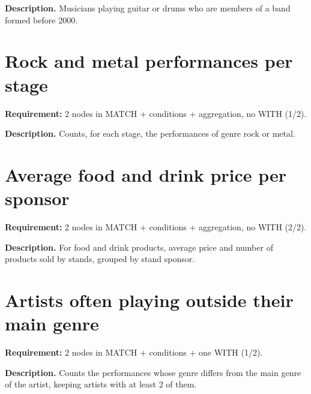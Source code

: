 \textbf{Description.} Musicians playing guitar or drums who are members of a band formed before 2000. 



\section{Rock and metal performances per stage}
\textbf{Requirement:} 2 nodes in MATCH + conditions + aggregation, no WITH (1/2).

\textbf{Description.} Counts, for each stage, the performances of genre rock or metal. 



\section{Average food and drink price per sponsor}
\textbf{Requirement:} 2 nodes in MATCH + conditions + aggregation, no WITH (2/2).

\textbf{Description.} For food and drink products, average price and number of products sold by stands, grouped by stand sponsor. 



\section{Artists often playing outside their main genre}
\textbf{Requirement:} 2 nodes in MATCH + conditions + one WITH (1/2).

\textbf{Description.} Counts the performances whose genre differs from the main genre of the artist, keeping artists with at least 2 of them. 

